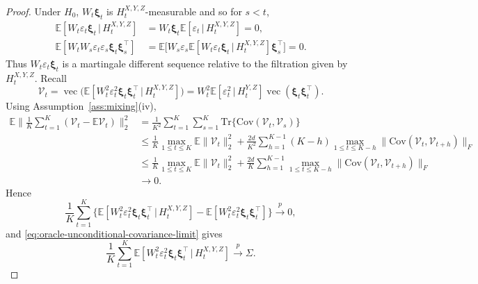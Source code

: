 \documentclass[12pt]{article}
\def\E{\mathbb{E}}
\newcommand{\Cov}{\mathrm{Cov}}
\newcommand{\Tr}{\mathrm{Tr}}
\newcommand{\Rajen}[1]{{ \color{red} Rajen: #1}}
\newcommand\given{\,|\,}
\numberwithin{equation}{section}
\begin{document}
\begin{proof}
Under \(H_0\),
\(W_t\boldsymbol\xi_t\) is
\(H_t^{X,Y,Z}\)-measurable and so
for \(s<t\),
\begin{align*}
\E[W_t\varepsilon_t\boldsymbol\xi_t\given H_t^{X,Y,Z}]
&=W_t\boldsymbol\xi_t\E[\varepsilon_t\given H_t^{X,Y,Z}]=0,\\
\E[W_tW_s\varepsilon_t\varepsilon_s\boldsymbol\xi_t\boldsymbol\xi_s^\top]
&=\E\big[W_s\varepsilon_s
\E[W_t\varepsilon_t\boldsymbol\xi_t\given H_t^{X,Y,Z}]
\boldsymbol\xi_s^\top\big]=0.
\end{align*}
Thus $W_t\varepsilon_t\boldsymbol\xi_t$ is a martingale different sequence relative to the filtration given by $H_t^{X,Y,Z}$. 
Recall
\[
\mathcal V_t =
\operatorname{vec}\big(
\E[W_t^2\varepsilon_t^2\boldsymbol\xi_t\boldsymbol\xi_t^\top
\given H_t^{X,Y,Z}]\big) = W_t^2\E[\varepsilon_t^2\given H_t^{Y,Z}]
\operatorname{vec}(\boldsymbol\xi_t\boldsymbol\xi_t^\top).
\]
Using Assumption~\ref{ass:mixing}(iv),
\begin{align*}
\E\Big\|\frac1K\sum_{t=1}^K(\mathcal V_t-\E\mathcal V_t)\Big\|_2^2
&=\frac1{K^2}\sum_{t=1}^K\sum_{s=1}^K
\Tr\{\Cov(\mathcal V_t,\mathcal V_s)\}\\
&\leq\frac1K\max_{1\leq t\leq K}\E\|\mathcal V_t\|_2^2
+\frac{2d}{K^2}\sum_{h=1}^{K-1}(K-h)
\max_{1\leq t\leq K-h}\|\Cov(\mathcal V_t,\mathcal V_{t+h})\|_F\\
&\leq\frac1K\max_{1\leq t\leq K}\E\|\mathcal V_t\|_2^2
+\frac{2d}{K}\sum_{h=1}^{K-1}
\max_{1\leq t\leq K-h}\|\Cov(\mathcal V_t,\mathcal V_{t+h})\|_F\\
& \rightarrow0.
\end{align*}
Hence
\begin{equation}
\label{eq:oracle-conditional-covariance-stabilization}
\frac1K\sum_{t=1}^K
\big\{
\E[W_t^2\varepsilon_t^2\boldsymbol\xi_t\boldsymbol\xi_t^\top
\given H_t^{X,Y,Z}]
-\E[W_t^2\varepsilon_t^2\boldsymbol\xi_t\boldsymbol\xi_t^\top]
\big\}\xrightarrow{p}0,
\end{equation}
and \eqref{eq:oracle-unconditional-covariance-limit} gives
\begin{equation}
\label{eq:oracle-conditional-covariance-limit}
\frac1K\sum_{t=1}^K
\E[W_t^2\varepsilon_t^2\boldsymbol\xi_t\boldsymbol\xi_t^\top
\given H_t^{X,Y,Z}]
\xrightarrow{p}\Sigma.
\end{equation}


\end{proof}
\end{document}
